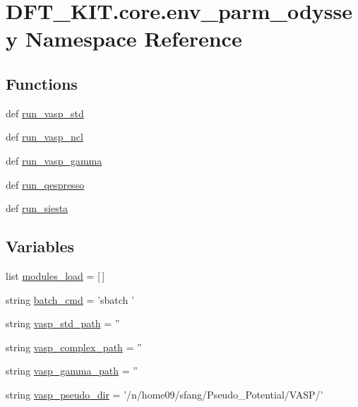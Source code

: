 \hypertarget{namespace_d_f_t___k_i_t_1_1core_1_1env__parm__odyssey}{\section{D\+F\+T\+\_\+\+K\+I\+T.\+core.\+env\+\_\+parm\+\_\+odyssey Namespace Reference}
\label{namespace_d_f_t___k_i_t_1_1core_1_1env__parm__odyssey}
}
\subsection*{Functions}
\begin{DoxyCompactItemize}
\item 
def \hyperlink{namespace_d_f_t___k_i_t_1_1core_1_1env__parm__odyssey_a30591f575c3c32f38a45796b8a21fc6a}{run\+\_\+vasp\+\_\+std}
\item 
def \hyperlink{namespace_d_f_t___k_i_t_1_1core_1_1env__parm__odyssey_a21180a73a95bb84731fbc3a1807bf1a1}{run\+\_\+vasp\+\_\+ncl}
\item 
def \hyperlink{namespace_d_f_t___k_i_t_1_1core_1_1env__parm__odyssey_a8bebd6a538d8319bf50612e3d82057db}{run\+\_\+vasp\+\_\+gamma}
\item 
def \hyperlink{namespace_d_f_t___k_i_t_1_1core_1_1env__parm__odyssey_a75e11fb480c4a9027061722b0d2fae85}{run\+\_\+qespresso}
\item 
def \hyperlink{namespace_d_f_t___k_i_t_1_1core_1_1env__parm__odyssey_a998b20adfbcdfb7f745f264ebb43cdfe}{run\+\_\+siesta}
\end{DoxyCompactItemize}
\subsection*{Variables}
\begin{DoxyCompactItemize}
\item 
list \hyperlink{namespace_d_f_t___k_i_t_1_1core_1_1env__parm__odyssey_a582dbd206f31a95552090dbb53bb55c9}{modules\+\_\+load} = \mbox{[}$\,$\mbox{]}
\item 
string \hyperlink{namespace_d_f_t___k_i_t_1_1core_1_1env__parm__odyssey_afbafb8b2ec32ee837e22118e431a348e}{batch\+\_\+cmd} = 'sbatch '
\item 
string \hyperlink{namespace_d_f_t___k_i_t_1_1core_1_1env__parm__odyssey_a70c21898b165cb1b987c3d04aa51ede1}{vasp\+\_\+std\+\_\+path} = ''
\item 
string \hyperlink{namespace_d_f_t___k_i_t_1_1core_1_1env__parm__odyssey_a67ca41da28f99757270a50665d707a20}{vasp\+\_\+complex\+\_\+path} = ''
\item 
string \hyperlink{namespace_d_f_t___k_i_t_1_1core_1_1env__parm__odyssey_ab633e475cbf076f8513ad68cb7445eee}{vasp\+\_\+gamma\+\_\+path} = ''
\item 
string \hyperlink{namespace_d_f_t___k_i_t_1_1core_1_1env__parm__odyssey_a9cdf5cde027dd951121b8b506ac0b823}{vasp\+\_\+pseudo\+\_\+dir} = '/n/home09/sfang/Pseudo\+\_\+\+Potential/V\+A\+S\+P/'
\end{DoxyCompactItemize}


